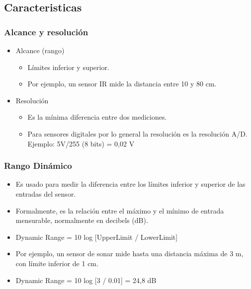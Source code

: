 \documentclass{beamer}
\begin{document}
\subsection{Caracteristicas}

\begin{frame}
\frametitle{Alcance y resolución}
\begin{itemize}
\item Alcance (rango)
\begin{itemize}
\item Límites inferior y superior.
\item Por ejemplo, un sensor IR mide la distancia entre 10 y 80 cm.
\end{itemize}
\item Resolución
\begin{itemize}
\item Es la mínima diferencia entre dos mediciones.
\item Para sensores digitales por lo general la resolución es la resolución A/D. Ejemplo: 5V/255 (8 bits) = 0,02 V
\end{itemize}
\end{itemize}
\end{frame}

\begin{frame}
\frametitle{Rango Dinámico}
\begin{itemize}
\item Es usado para medir la diferencia entre los límites inferior y superior de las entradas del sensor.
\item Formalmente, es la relación entre el máximo y el mínimo de entrada mensurable, normalmente en decibels (dB).
\item Dynamic Range = 10 log [UpperLimit / LowerLimit]
\item Por ejemplo, un sensor de sonar mide hasta una distancia máxima de 3 m, con límite inferior de 1 cm.
\item Dynamic Range = 10 log [3 / 0.01] = 24,8 dB
\end{itemize}
\end{frame}
\end{document}
